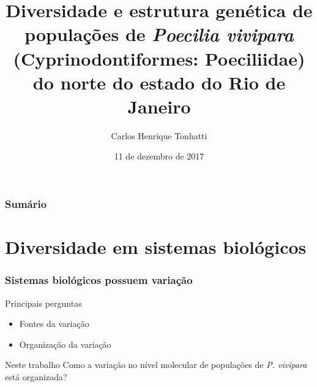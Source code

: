 \documentclass{beamer}
\title[Defesa de Doutorado]{Diversidade e estrutura genética de populações de
\textit{Poecilia vivipara} (Cyprinodontiformes: Poeciliidae) do norte do estado do Rio de Janeiro}
\author {Carlos Henrique Tonhatti}
\institute[Unicamp]{Universidade Estadual de Campinas}
\date{11 de dezembro de 2017}
\begin{document}
 \frame{\titlepage} %


\begin{frame}
 \frametitle{Sumário}
 \tableofcontents[pausesections]
  \setcounter{tocdepth}{2}%
\end{frame}




\section{Diversidade em sistemas biológicos}
\begin{frame}
  \frametitle{Sistemas biológicos possuem variação}
  \begin{center}
  \end{center}
\end{frame}

\begin{frame}{Principais perguntas}

  \begin{itemize}[<+->]
  \item  Fontes da variação
  \item  Organiza\c{c}ão da variação
  \end{itemize}
  \vspace{20pt}
\pause
\begin{block}{Neste trabalho}
 Como a varia\c{c}ão no nível molecular de popula\c{c}ões de \textit{P. vivipara} está organizada?
\end{block}

  
\end{frame}
\end{document}
